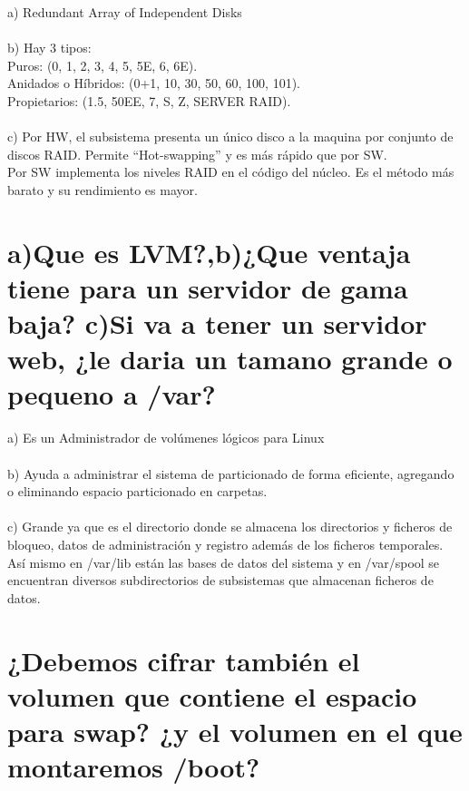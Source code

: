 a) Redundant Array of Independent Disks\\\\
b) Hay 3 tipos:\\
Puros: (0, 1, 2, 3, 4, 5, 5E, 6, 6E).\\
Anidados o Híbridos: (0+1, 10, 30, 50, 60, 100, 101).\\
Propietarios: (1.5, 50EE, 7, S, Z, SERVER RAID).\\\\
c) Por HW, el subsistema presenta un único disco a la maquina por conjunto de discos RAID. Permite “Hot-swapping” y es más rápido que por SW.\\
Por SW implementa los niveles RAID en el código del núcleo. Es el método más barato y su rendimiento es mayor.
\clearpage
\section{a)Que es LVM?,b)¿Que ventaja tiene para un servidor de gama baja? c)Si va a tener un servidor web, ¿le daria un tamano grande o pequeno a /var? \cite{10p91}}

a) Es un Administrador de volúmenes lógicos para Linux\\\\
b) Ayuda a administrar el sistema de particionado de forma eficiente, agregando o eliminando espacio particionado en carpetas.\\\\
c) Grande ya que es el directorio donde se almacena los directorios y ficheros de bloqueo, datos de administración y registro además de los ficheros temporales.\\
Así mismo en /var/lib están las bases de datos del sistema y en /var/spool se encuentran diversos subdirectorios de subsistemas que almacenan ficheros de datos.

\section{¿Debemos cifrar también el volumen que contiene el espacio para swap? ¿y el volumen en el que montaremos /boot?}

